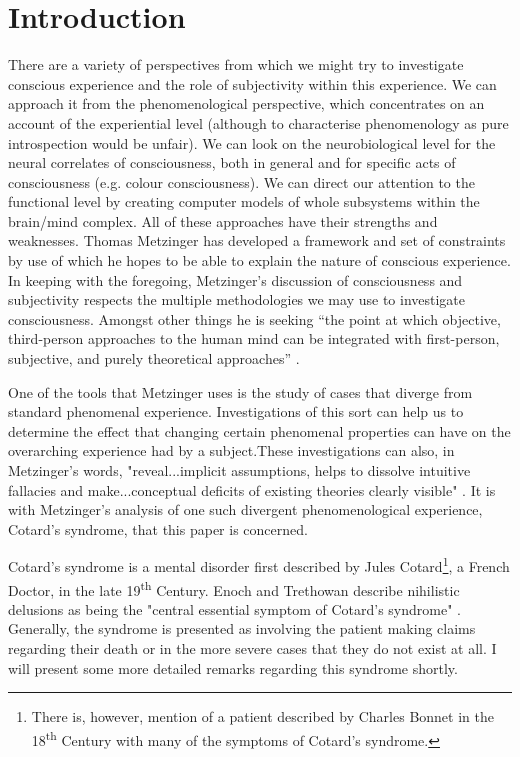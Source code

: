 
\chapter{Introduction}
\label{chap:intro}

There are a variety of perspectives from which we might try to investigate conscious experience and the role of subjectivity within this experience. We can approach it from the phenomenological perspective, which concentrates on an account of the experiential level (although to characterise phenomenology as pure introspection would be unfair). We can look on the neurobiological level for the neural correlates of consciousness, both in general and for specific acts of consciousness (e.g. colour consciousness). We can direct our attention to the functional level by creating computer models of whole subsystems within the brain/mind complex. All of these approaches have their strengths and weaknesses. Thomas Metzinger has developed a framework and set of constraints by use of which he hopes to be able to explain the nature of conscious experience. In keeping with the foregoing, Metzinger’s discussion of consciousness and subjectivity respects the multiple methodologies we may use to investigate consciousness. Amongst other things he is seeking “the point at which objective, third-person approaches to the human mind can be integrated with first-person, subjective, and purely theoretical approaches” \cite{metzinger2003}.

One of the tools that Metzinger uses is the study of cases that diverge from standard phenomenal experience. Investigations of this sort can help us to determine the effect that changing certain phenomenal properties can have on the overarching experience had by a subject.These investigations can also, in Metzinger's words, "reveal...implicit assumptions, helps to dissolve intuitive fallacies and make...conceptual deficits of existing theories clearly visible" \cite[p. 213]{metzinger2003}. It is with Metzinger's analysis of one such divergent phenomenological experience, Cotard's syndrome, that this paper is concerned.

Cotard's syndrome is a mental disorder first described by Jules Cotard\footnote{There is, however, mention of a patient described by Charles Bonnet in the 18\textsuperscript{th} Century with many of the symptoms of Cotard's syndrome\cite{forstl1992}.}, a French Doctor, in the late 19\textsuperscript{th} Century. Enoch and Trethowan describe nihilistic delusions as being the "central essential symptom of Cotard's syndrome" \cite[p. 172]{enoch1991}. Generally, the syndrome is presented as involving the patient making claims regarding their death or in the more severe cases that they do not exist at all. I will present some more detailed remarks regarding this syndrome shortly.

